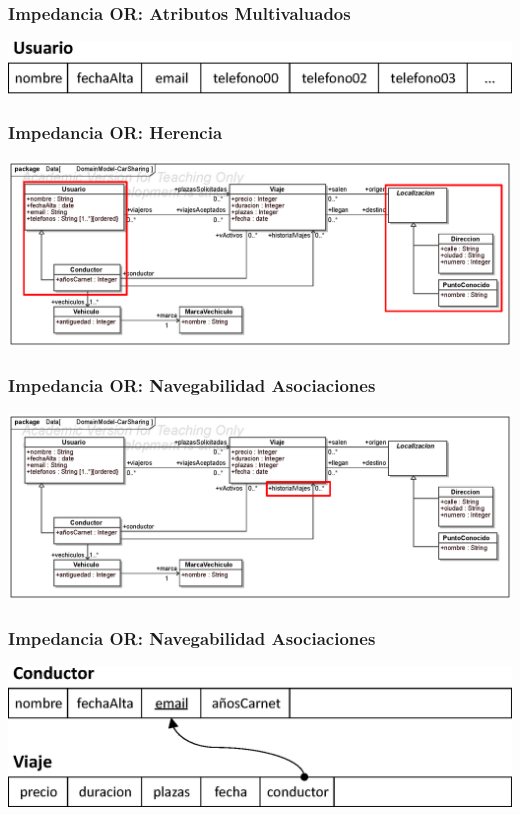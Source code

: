 \documentclass[a4paper,slidestop,xcolor=pst,blue]{beamer}
\begin{document}
\begin{frame}[c]
    \frametitle{Impedancia OR: Atributos Multivaluados}
    \begin{center}
        \includegraphics[width=0.8\linewidth]{images/ooMismatch/ooMismatch03.eps}
    \end{center}
\end{frame}

\begin{frame}[c]
    \frametitle{Impedancia OR: Herencia}
    \begin{center}
        \includegraphics[width=\linewidth]{images/ooMismatch/ooMismatch04.eps}
    \end{center}
\end{frame}

\begin{frame}[c]
    \frametitle{Impedancia OR: Navegabilidad Asociaciones}
    \begin{center}
        \includegraphics[width=\linewidth]{images/ooMismatch/ooMismatch05.eps}
    \end{center}
\end{frame}

\begin{frame}[c]
    \frametitle{Impedancia OR: Navegabilidad Asociaciones}
    \begin{center}
        \includegraphics[width=0.8\linewidth]{images/ooMismatch/ooMismatch06.eps}
    \end{center}
\end{frame}
\end{document}
